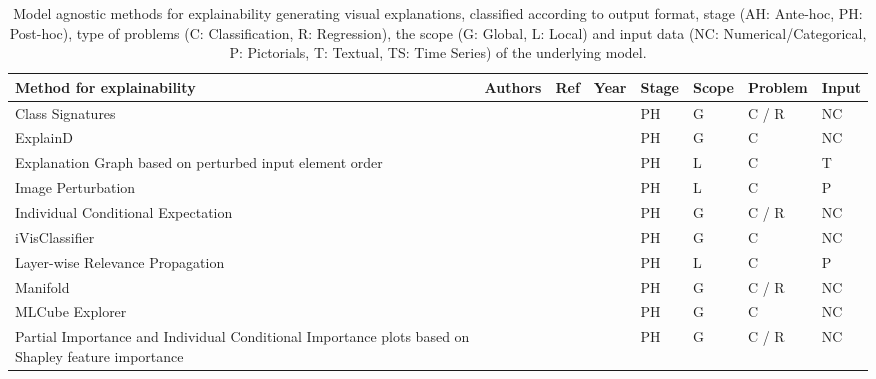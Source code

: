 \documentclass[final,1p,times]{elsarticle}
\begin{document}
\begin{table}[h!]
\footnotesize
    \caption{Model agnostic methods for explainability generating visual explanations, classified according to output format, stage (AH: Ante-hoc, PH: Post-hoc), type of problems (C: Classification, R: Regression), the scope (G: Global, L: Local) and input data (NC: Numerical/Categorical, P: Pictorials, T: Textual, TS: Time Series) of the underlying model.}
    \label{tab:model-agnostic-visual}
    \begin{tabular}{m{4.5cm} m{2.2cm} m{0.5cm} m{0.5cm} m{0.5cm} m{0.5cm} m{0.7cm} m{0.7cm}}
    \hline
    Method for explainability & Authors & Ref & Year & Stage & Scope & Problem & Input\\
    \hline
    Class Signatures & \citeauthor{krause2016using} & \cite{krause2016using} & \citeyear{krause2016using} & PH & G & C / R & NC\\
    ExplainD &  \citeauthor{poulin2006visual} &  \cite{poulin2006visual} &  \citeyear{poulin2006visual} & PH & G & C & NC\\
    Explanation Graph based on perturbed input element order &  \citeauthor{alvarez2017causal} &  \cite{alvarez2017causal} &  \citeyear{alvarez2017causal} & PH & L & C & T\\
    Image Perturbation &  \citeauthor{fong2017interpretable} &  \cite{fong2017interpretable} &  \citeyear{fong2017interpretable} & PH & L & C & P\\
    Individual Conditional Expectation  & \citeauthor{goldstein2015peeking} & \cite{goldstein2015peeking} & \citeyear{goldstein2015peeking} & PH & G & C / R & NC\\
    iVisClassifier & \citeauthor{choo2010ivisclassifier} & \cite{choo2010ivisclassifier} & \citeyear{choo2010ivisclassifier} & PH & G & C & NC\\
    Layer-wise Relevance Propagation  &  \citeauthor{bach2015pixel} &  \cite{bach2015pixel} &  \citeyear{bach2015pixel} & PH & L & C & P\\
    Manifold &  \citeauthor{zhang2019manifold} & \cite{zhang2019manifold} & \citeyear{zhang2019manifold} & PH & G & C / R & NC\\
    MLCube Explorer &  \citeauthor{kahng2016visual} &  \cite{kahng2016visual} &  \citeyear{kahng2016visual} & PH & G & C & NC\\
    Partial Importance and Individual Conditional Importance  plots based on Shapley feature importance & \citeauthor{casalicchio2018visualizing} & \cite{casalicchio2018visualizing} & \citeyear{casalicchio2018visualizing} & PH & G & C / R & NC\\

\end{tabular}
\end{table}
\end{document}
